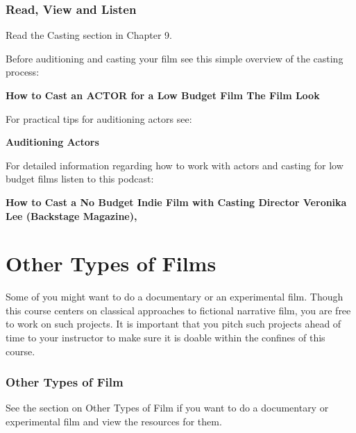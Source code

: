 \documentclass[
]{book}
\begin{document}
\begin{reflect}
\hypertarget{read-view-and-listen}{%
\subsubsection*{Read, View and Listen}\label{read-view-and-listen}}

Read the Casting section in Chapter 9.

Before auditioning and casting your film see this simple overview of the casting process:

\textbf{How to Cast an ACTOR for a Low Budget Film \textbar{} The Film Look}

For practical tips for auditioning actors see:

\textbf{Auditioning Actors}

For detailed information regarding how to work with actors and casting for low budget films listen to this podcast:

\textbf{How to Cast a No Budget Indie Film with Casting Director Veronika Lee (Backstage Magazine),}
\end{reflect}

\hypertarget{other-types-of-films}{%
\section*{Other Types of Films}\label{other-types-of-films}}

Some of you might want to do a documentary or an experimental film. Though this course centers on classical approaches to fictional narrative film, you are free to work on such projects. It is important that you pitch such projects ahead of time to your instructor to make sure it is doable within the confines of this course.

\begin{reflect}
\hypertarget{other-types-of-film}{%
\subsubsection*{Other Types of Film}\label{other-types-of-film}}

See the section on Other Types of Film if you want to do a documentary or experimental film and view the resources for them.
\end{reflect}
\end{document}
